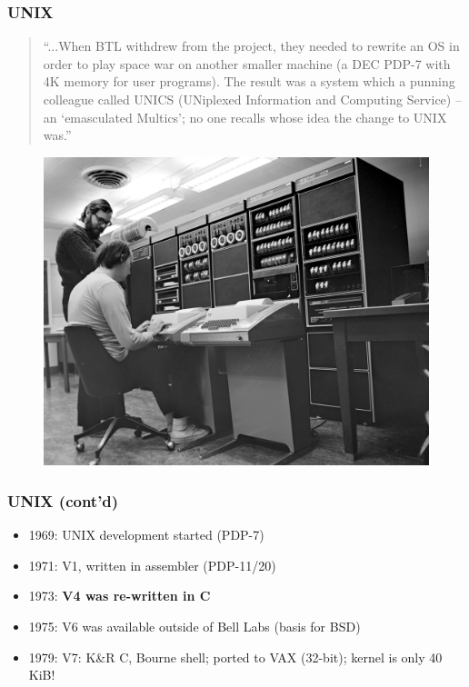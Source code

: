 \documentclass[aspectratio=169]{beamer}
\begin{document}
\begin{frame}
  \frametitle{UNIX}
    \begin{quotation}
``...When BTL withdrew from the project, they needed to rewrite an OS in order
to play space war on another smaller machine (a DEC PDP-7 with 4K memory
for user programs). The result was a system which a punning colleague
called UNICS (UNiplexed Information and Computing Service) -- an
`emasculated Multics'; no one recalls whose idea the change to UNIX was.''
    \end{quotation}
    \vspace*{-5mm} %
    \begin{figure}
      \centering
      \includegraphics[scale=0.8]{images/ken-and-dennis.jpg}
    \end{figure}
    \vspace*{-12mm} %
\end{frame}

\begin{frame}
  \frametitle{UNIX (cont'd)}
  \begin{itemize}
    \item 1969: \textsc{UNIX} development started (PDP-7)
    \item 1971: V1, written in assembler (PDP-11/20)
    \item 1973: \textbf{V4 was re-written in C}
    \item 1975: V6 was available outside of Bell Labs (basis for BSD)
    \item 1979: V7: K\&R C, Bourne shell; ported to VAX (32-bit); kernel is only 40 KiB!
  \end{itemize}
\end{frame}
\end{document}
